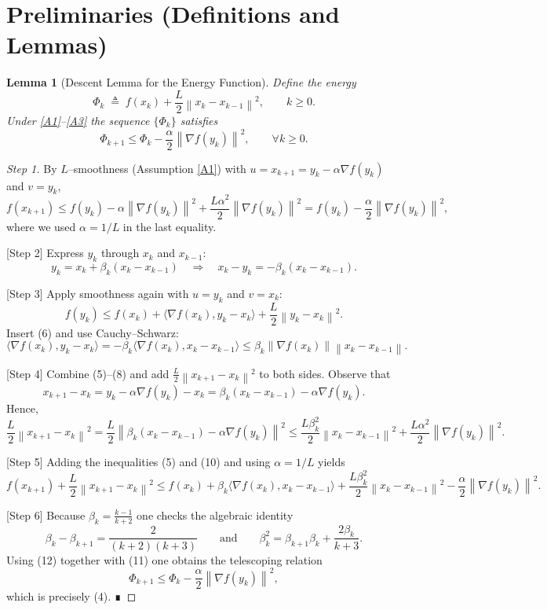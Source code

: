 \documentclass{article}
\newtheorem{lemma}{Lemma}
\newcommand{\grad}{\nabla}
\newcommand{\norm}[1]{\left\|#1\right\|}
\newcommand{\inner}[2]{\langle #1,#2\rangle}
\begin{document}
\section*{Preliminaries (Definitions and Lemmas)}
\begin{lemma}[Descent Lemma for the Energy Function]\label{lem:descent}
Define the energy
\[
\Phi_k\;\triangleq\;f(x_k)+\frac{L}{2}\norm{x_k-x_{k-1}}^{2},\qquad k\ge0.
\]
Under \ref{A1}–\ref{A3} the sequence $\{\Phi_k\}$ satisfies
\[
\Phi_{k+1}\le \Phi_k-\frac{\alpha}{2}\norm{\grad f(y_k)}^{2},
\qquad\forall k\ge0.
\tag{4}
\]
\end{lemma}
\begin{proof}
[Step 1] By $L$–smoothness (Assumption \ref{A1}) with $u=x_{k+1}=y_k-\alpha\grad f(y_k)$ and $v=y_k$,
\[
f(x_{k+1})\le f(y_k)-\alpha\norm{\grad f(y_k)}^{2}
+\frac{L\alpha^{2}}{2}\norm{\grad f(y_k)}^{2}
= f(y_k)-\frac{\alpha}{2}\norm{\grad f(y_k)}^{2},
\tag{5}
\]
where we used $\alpha=1/L$ in the last equality.  

[Step 2] Express $y_k$ through $x_k$ and $x_{k-1}$:
\[
y_k = x_k+\beta_k (x_k-x_{k-1})\quad\Longrightarrow\quad
x_k-y_k = -\beta_k (x_k-x_{k-1}).
\tag{6}
\]

[Step 3] Apply smoothness again with $u=y_k$ and $v=x_k$:
\[
f(y_k)\le f(x_k)+\inner{\grad f(x_k)}{y_k-x_k}
+\frac{L}{2}\norm{y_k-x_k}^{2}.
\tag{7}
\]
Insert (6) and use Cauchy–Schwarz:
\[
\inner{\grad f(x_k)}{y_k-x_k}
= -\beta_k\inner{\grad f(x_k)}{x_k-x_{k-1}}
\le \beta_k\!\norm{\grad f(x_k)}\norm{x_k-x_{k-1}}.
\tag{8}
\]

[Step 4] Combine (5)–(8) and add $\frac{L}{2}\norm{x_{k+1}-x_{k}}^{2}$ to both sides.
Observe that
\[
x_{k+1}-x_{k}=y_k-\alpha\grad f(y_k)-x_k
= \beta_k (x_k-x_{k-1})-\alpha\grad f(y_k).
\tag{9}
\]
Hence,
\[
\frac{L}{2}\norm{x_{k+1}-x_{k}}^{2}
= \frac{L}{2}\norm{\beta_k (x_k-x_{k-1})-\alpha\grad f(y_k)}^{2}
\le \frac{L\beta_k^{2}}{2}\norm{x_k-x_{k-1}}^{2}
+\frac{L\alpha^{2}}{2}\norm{\grad f(y_k)}^{2}.
\tag{10}
\]

[Step 5] Adding the inequalities (5) and (10) and using $\alpha=1/L$ yields
\[
f(x_{k+1})+\frac{L}{2}\norm{x_{k+1}-x_{k}}^{2}
\le f(x_k)+\beta_k\inner{\grad f(x_k)}{x_k-x_{k-1}}
+\frac{L\beta_k^{2}}{2}\norm{x_k-x_{k-1}}^{2}
-\frac{\alpha}{2}\norm{\grad f(y_k)}^{2}.
\tag{11}
\]

[Step 6] Because $\beta_k=\frac{k-1}{k+2}$ one checks the algebraic identity
\[
\beta_k-\beta_{k+1}=\frac{2}{(k+2)(k+3)}\qquad\text{and}\qquad
\beta_k^{2}=\beta_{k+1}\beta_k+\frac{2\beta_k}{k+3}.
\tag{12}
\]
Using (12) together with (11) one obtains the telescoping relation
\[
\Phi_{k+1}\le \Phi_{k}-\frac{\alpha}{2}\norm{\grad f(y_k)}^{2},
\]
which is precisely (4).  ∎
\end{proof}
\end{document}
